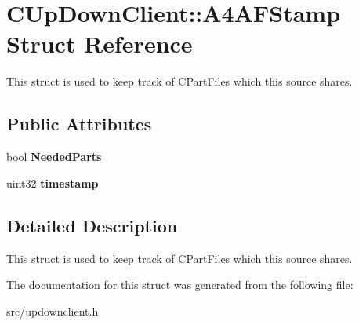 \section{CUpDownClient::A4AFStamp Struct Reference}
\label{structCUpDownClient_1_1A4AFStamp}


This struct is used to keep track of CPartFiles which this source shares.  
\subsection*{Public Attributes}
\begin{DoxyCompactItemize}
\item 
bool {\bf NeededParts}\label{structCUpDownClient_1_1A4AFStamp_a9da693a79f3c9be26c9a8ecf0861200e}

\item 
uint32 {\bf timestamp}\label{structCUpDownClient_1_1A4AFStamp_a0cb43b2fdce70fbd9e771ebf5f22b698}

\end{DoxyCompactItemize}


\subsection{Detailed Description}
This struct is used to keep track of CPartFiles which this source shares. 

The documentation for this struct was generated from the following file:\begin{DoxyCompactItemize}
\item 
src/updownclient.h\end{DoxyCompactItemize}
